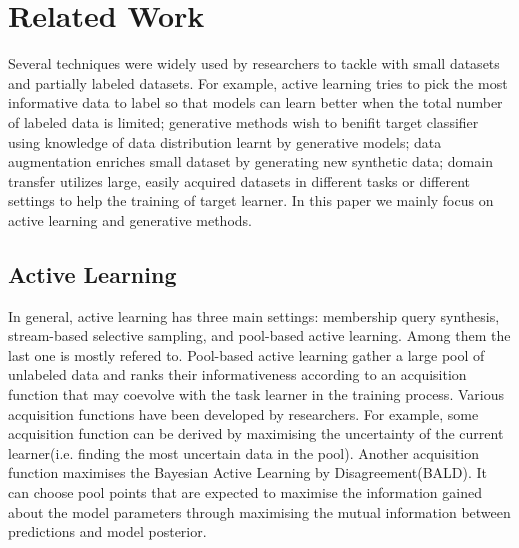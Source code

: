 \documentclass[letterpaper]{article}
\begin{document}
\section{Related Work}
Several techniques were widely used by researchers to tackle with small datasets and partially labeled datasets. For example, active learning\cite{settles2009active} tries to pick the most informative data to label so that models can learn better when the total number of labeled data is limited; generative methods\cite{kingma2014semi}\cite{springenberg2015unsupervised} wish to benifit target classifier using knowledge of data distribution learnt by generative models; data augmentation\cite{tanner1987calculation} enriches small dataset by generating new synthetic data; domain transfer\cite{pan2009survey} utilizes large, easily acquired datasets in different tasks or different settings to help the training of target learner. In this paper we mainly focus on active learning and generative methods.
\subsection{Active Learning}
In general, active learning has three main settings: membership query synthesis, stream-based selective sampling, and
pool-based active learning\cite{pan2009survey}. Among them the last one is mostly refered to. Pool-based active learning gather a large pool of unlabeled data and ranks their informativeness according to an acquisition function that may coevolve with the task learner in the training process. Various acquisition functions have been developed by researchers. For example, some acquisition function can be derived by maximising the uncertainty of the current learner(i.e. finding the most uncertain data in the pool). Another acquisition function maximises the Bayesian Active Learning by Disagreement(BALD)\cite{houlsby2011bayesian}. It can choose pool points that are expected to maximise the information gained about the model parameters through maximising the mutual information between predictions and model posterior.
\end{document}
